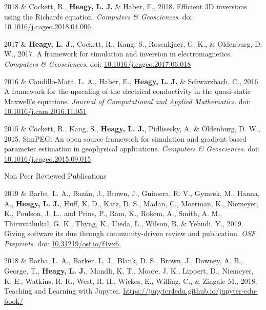 \documentclass[a4paper, 11pt]{article}
\newcommand{\doi}[1]{doi: \href{https://doi.org/#1}{#1}}
\newcommand{\subheading}[1]{
    \vspace{0.4cm}
    {\Large #1}\\
    \vspace{-0.2cm}
}
\begin{document}
\begin{entryright}
2018 & Cockett, R., \textbf{Heagy, L. J.} \& Haber, E., 2018. Efficient 3D inversions using the Richards equation. \emph{Computers \& Geosciences}. \doi{10.1016/j.cageo.2018.04.006}
\end{entryright}

\begin{entryright}
2017 & \textbf{Heagy, L. J.}, Cockett, R., Kang, S., Rosenkjaer, G. K., \& Oldenburg, D. W., 2017. A framework for simulation and inversion in electromagnetics. \emph{Computers \& Geosciences}. \doi{10.1016/j.cageo.2017.06.018}
\end{entryright}

\begin{entryright}
2016 & Caudillo-Mata, L. A., Haber, E., \textbf{Heagy, L. J.} \& Schwarzbach, C., 2016. A framework for the upscaling of the electrical conductivity in the quasi-static Maxwell's equations. \emph{Journal of Computational and Applied Mathematics}. \doi{10.1016/j.cam.2016.11.051}
\end{entryright}

\begin{entryright}
2015 & Cockett, R., Kang, S., \textbf{Heagy, L. J.}, Pidlisecky, A. \& Oldenburg, D. W., 2015. SimPEG: An open source framework for simulation and gradient based parameter estimation in geophysical applications. \emph{Computers \& Geosciences}. \doi{10.1016/j.cageo.2015.09.015}
\end{entryright}


\subheading{Non Peer Reviewed Publications}

\begin{entryright}
2019 & Barba, L. A., Baz\'an, J., Brown, J., Guimera, R. V., Gymrek, M., Hanna, A., \textbf{Heagy, L. J.}, Huff, K. D., Katz, D. S., Madan, C., Moerman, K., Niemeyer, K., Poulson, J. L., and Prins, P., Ram, K., Rokem, A., Smith, A. M., Thiruvathukal, G. K., Thyng, K., Uieda, L., Wilson, B. \& Yehudi, Y.,
2019. Giving software its due through community-driven review and publication. \emph{OSF Preprints}. \doi{10.31219/osf.io/f4vx6},
\end{entryright}

\begin{entryright}
2018 & Barba, L. A., Barker, L. J., Blank, D. S., Brown, J., Downey, A. B., George, T., \textbf{Heagy, L. J.},  Mandli, K. T., Moore, J. K., Lippert, D.,  Niemeyer, K. E., Watkins, R. R., West, R. H., Wickes, E., Willing, C., \& Zingale M., 2018. Teaching and Learning with Jupyter. \href{https://jupyter4edu.github.io/jupyter-edu-book/}{https://jupyter4edu.github.io/jupyter-edu-book/}
\end{entryright}
\end{document}
